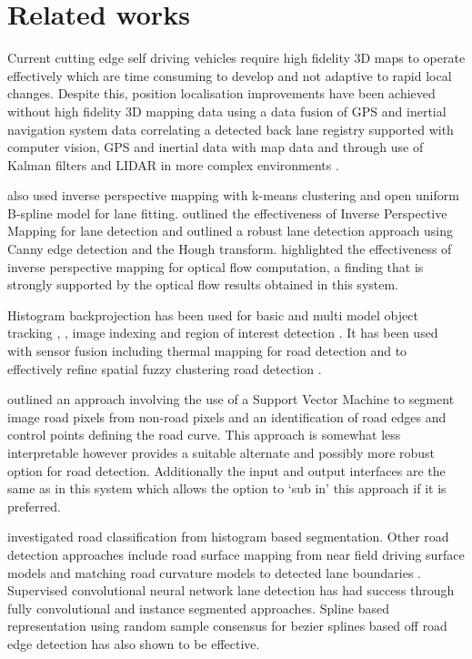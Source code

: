 \documentclass[]{aiaa-tc}%
\begin{document}
\section{Related works}

Current cutting edge self driving vehicles require high fidelity 3D maps to operate effectively which are time consuming to develop and not adaptive to rapid local changes. Despite this, position localisation improvements have been achieved without high fidelity 3D mapping data using a data fusion of GPS and inertial navigation system data \citep{gpsInsFusion} correlating a detected back lane registry supported with computer vision, GPS and inertial data with map data \citep{lowCostSensorNav} and through use of Kalman filters and LIDAR in more complex environments \citep{robotLIDARSLAM}.


\citet{ipmBasedLaneDetectionApproach} also used inverse perspective mapping with k-means clustering and open uniform B-spline model for lane fitting. \citet{ipmForLaneTracking} outlined the effectiveness of Inverse Perspective Mapping for lane detection and \citet{canneyAndHoughLanes} outlined a robust lane detection approach using Canny edge detection and the Hough transform. \citet{ipmOpticalFlow} highlighted the effectiveness of inverse perspective mapping for optical flow computation, a finding that is strongly supported by the optical flow results obtained in this system.


Histogram backprojection has been used for basic \citep{histBackObjectTracking} and multi model object tracking \citep{histBackMultiObjectTrack}, \citep{histBackObjectMultiLighting}, image indexing \citep{histBackImageIndexing} and region of interest detection \citep{histBackObjectOfInterestDetection}. It has been used with sensor fusion including thermal mapping for road detection \citep{histBackThermal} and to effectively refine spatial fuzzy clustering road detection \citep{histBackRefineShadows}.

\citet{moncularLaneDetectAndTrack} outlined an approach involving the use of a Support Vector Machine to segment image road pixels from non-road pixels and an identification of road edges and control points defining the road curve. This approach is somewhat less interpretable however provides a suitable alternate and possibly more robust option for road detection. Additionally the input and output interfaces are the same as in this system which allows the option to `sub in' this approach if it is preferred. 

\citet{histogramSegmentationRoadClassification} investigated road classification from histogram based segmentation. Other road detection approaches include road surface mapping from near field driving surface models \citep{darpaChallengeRoadDetection} and matching road curvature models to detected lane boundaries \citep{intersectionDetectionSingleCamera}. Supervised convolutional neural network lane detection has had success through fully convolutional \citep{cnnLanes1} and instance segmented \citep{cnnLanes2} approaches. Spline based representation using random sample consensus for bezier splines based off road edge detection \citep{ransicBezierFit} has also shown to be effective.
\end{document}
